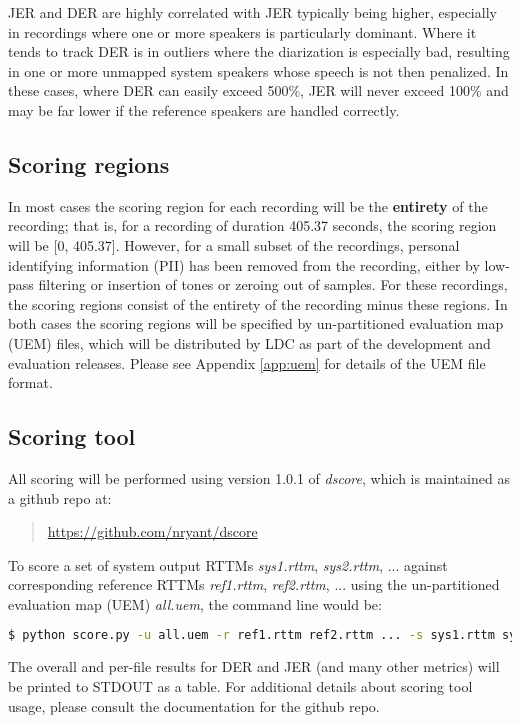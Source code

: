\documentclass{article}
\begin{document}
JER and DER are highly correlated with JER typically being higher, especially in recordings where one or more speakers is particularly dominant. Where it tends to track DER is in outliers where the diarization is especially bad, resulting in one or more unmapped system speakers whose speech is not then penalized. In these cases, where DER can easily exceed 500\%, JER will never exceed 100\% and may be far lower if the reference speakers are handled correctly. 


\subsection{Scoring regions}
In most cases the scoring region for each recording will be the {\bf entirety} of the recording; that is, for a recording of duration 405.37 seconds, the scoring region will be [0, 405.37]. However, for a small subset of the recordings, personal identifying information (PII) has been removed from the recording, either by low-pass filtering or insertion of tones or zeroing out of samples. For these recordings, the scoring regions consist of the entirety of the recording minus these regions. In both cases the scoring regions will be specified by un-partitioned evaluation map (UEM) files, which will be distributed by LDC as part of the development and evaluation releases. Please see Appendix \ref{app:uem} for details of the UEM file format.


\subsection{Scoring tool}
All scoring will be performed using version 1.0.1 of {\it dscore}, which is maintained as a github repo at:
    \begin{quote}
        \url{https://github.com/nryant/dscore}
    \end{quote}
To score a set of system output RTTMs {\it sys1.rttm}, {\it sys2.rttm}, ... against corresponding reference RTTMs {\it ref1.rttm}, {\it ref2.rttm}, ... using the un-partitioned evaluation map (UEM) {\it all.uem}, the command line would be:
%
\begin{lstlisting}[language=bash]
  $ python score.py -u all.uem -r ref1.rttm ref2.rttm ... -s sys1.rttm sys2.rttm ...
\end{lstlisting}
%
The overall and per-file results for DER and JER (and many other metrics) will be printed to STDOUT as a table. For additional details about scoring tool usage, please consult the documentation for the github repo.
\end{document}
